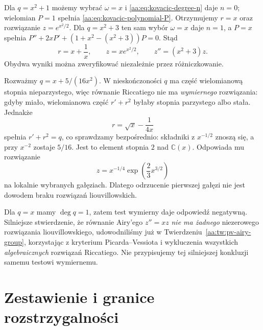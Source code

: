 \begin{przyklad}
\label{aa:prz:kovacic-polynomial-success}
Dla $q=x^2+1$ możemy
wybrać $\omega=x$ i
\eqref{aa:eq:kovacic-degree-n}
daje $n=0$; wielomian
$P=1$ spełnia
\eqref{aa:eq:kovacic-polynomial-P}.
Otrzymujemy $r=x$ oraz
rozwiązanie
$z=e^{x^2/2}$.
Dla $q=x^2+3$ ten sam
wybór $\omega=x$
daje $n=1$, a
$P=x$ spełnia
$P''+2xP'+(1+x^2-(x^2+3))P=0$.
Stąd
\[
 r=x+\frac1x,\qquad
 z=xe^{x^2/2},\qquad
 z''=(x^2+3)z.
\]
Obydwa wyniki można
zweryfikować niezależnie
przez różniczkowanie.
\end{przyklad}

\begin{przyklad}
\label{aa:prz:kovacic-quadratic-example}
Rozważmy
$q=x+5/(16x^2)$.
W nieskończoności $q$
ma część wielomianową
stopnia nieparzystego,
więc równanie Riccatiego
nie ma \emph{wymiernego}
rozwiązania: gdyby miało,
wielomianowa część
$r'+r^2$ byłaby stopnia
parzystego albo stała.
Jednakże
\[
 r=\sqrt{x}-\frac1{4x}
\]
spełnia $r'+r^2=q$,
co sprawdzamy bezpośrednio:
składniki z $x^{-1/2}$
znoszą się, a przy
$x^{-2}$ zostaje $5/16$.
Jest to element
stopnia $2$ nad
$\mathbb C(x)$. Odpowiada
mu rozwiązanie
\[
 z=x^{-1/4}
       \exp\left(\frac23 x^{3/2}\right)
\]
na lokalnie wybranych
gałęziach. Dlatego
odrzucenie pierwszej gałęzi
nie jest dowodem braku
rozwiązań liouvillowskich.
\end{przyklad}

\begin{przyklad}
\label{aa:prz:kovacic-airy}
Dla $q=x$ mamy
$\deg q=1$, zatem test
wymierny daje odpowiedź negatywną.
Silniejsze stwierdzenie,
że równanie Airy'ego
$z''=xz$ \emph{nie ma żadnego}
niezerowego rozwiązania
liouvillowskiego,
udowodniliśmy już w
Twierdzeniu~\ref{aa:tw:pv-airy-group},
korzystając z kryterium
Picarda--Vessiota i
wykluczenia wszystkich
\emph{algebraicznych}
rozwiązań Riccatiego.
Nie przypisujemy tej
silniejszej konkluzji
samemu testowi wymiernemu.
\end{przyklad}

\section{Zestawienie i granice rozstrzygalności}

